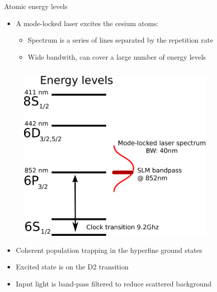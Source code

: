 \begin{block}{Atomic energy levels}
  \begin{itemize}
  \item A mode-locked laser excites the cesium atoms:
    \begin{itemize}
    \item Spectrum is a series of lines separated by the repetition rate
    \item Wide bandwith, can cover a large number of energy levels
    \end{itemize}
  \end{itemize}
  \begin{columns}
    \begin{column}{0.49\textwidth}
      \begin{figure}
        \begin{center}
          \includegraphics[width=.85\textwidth]{figures/energylevels}
        \end{center}
      \end{figure}
      \begin{itemize}
      \item Coherent population trapping in the hyperfine ground states
      \item Excited state is on the D2 transition
      \item Input light is band-pass filtered to reduce scattered background
      \end{itemize}
    \end{column}
    \begin{column}{0.49\textwidth}
      \begin{figure}

\end{figure}
\end{column}
\end{columns}
\end{block}
